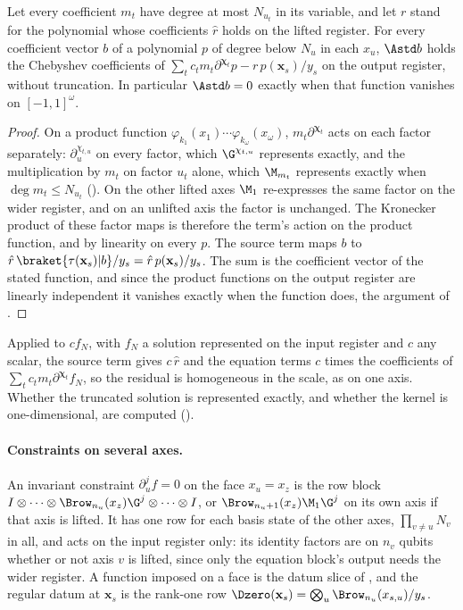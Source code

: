 \begin{proposition}
\label{prop:multi-axis}
Let every coefficient $m_t$ have degree at most $N_{u_t}$ in its variable, and let $r$ stand for the polynomial whose coefficients $\hat r$ holds on the lifted register. For every coefficient vector $b$ of a polynomial $p$ of degree below $N_u$ in each $x_u$, $\Astd b$ holds the Chebyshev coefficients of $\sum_tc_tm_t\partial^{\boldsymbol\chi_t}p-r\,p(\mathbf x_s)/y_s$ on the output register, without truncation. In particular $\Astd b=0$ exactly when that function vanishes on $[-1,1]^\omega$.
\end{proposition}
\begin{proof}
On a product function $\varphi_{k_1}(x_1)\cdots\varphi_{k_\omega}(x_\omega)$, $m_t\partial^{\boldsymbol\chi_t}$ acts on each factor separately: $\partial_u^{\chi_{t,u}}$ on every factor, which $\G^{\chi_{t,u}}$ represents exactly, and the multiplication by $m_t$ on factor $u_t$ alone, which $\M_{m_t}$ represents exactly when $\deg m_t\le N_{u_t}$ (). On the other lifted axes $\M_1$ re-expresses the same factor on the wider register, and on an unlifted axis the factor is unchanged. The Kronecker product of these factor maps is therefore the term's action on the product function, and by linearity on every $p$. The source term maps $b$ to $\hat r\,\braket{\tau(\mathbf x_s)|b}/y_s=\hat r\,p(\mathbf x_s)/y_s$. The sum is the coefficient vector of the stated function, and since the product functions on the output register are linearly independent it vanishes exactly when the function does, the argument of .
\end{proof}
Applied to $cf_N$, with $f_N$ a solution represented on the input register and $c$ any scalar, the source term gives $c\,\hat r$ and the equation terms $c$ times the coefficients of $\sum_tc_tm_t\partial^{\boldsymbol\chi_t}f_N$, so the residual is homogeneous in the scale, as on one axis. Whether the truncated solution is represented exactly, and whether the kernel is one-dimensional, are computed ().

\paragraph{Constraints on several axes.} An invariant constraint $\partial_u^{j}f=0$ on the face $x_u=x_z$ is the row block $I\otimes\dots\otimes\Brow_{n_u}(x_z)\G^{j}\otimes\dots\otimes I$, or $\Brow_{n_u+1}(x_z)\M_1\G^{j}$ on its own axis if that axis is lifted. It has one row for each basis state of the other axes, $\prod_{v\ne u}N_v$ in all, and acts on the input register only: its identity factors are on $n_v$ qubits whether or not axis $v$ is lifted, since only the equation block's output needs the wider register. A function imposed on a face is the datum slice of , and the regular datum at $\mathbf x_s$ is the rank-one row $\Dzero(\mathbf x_s)=\bigotimes_u\Brow_{n_u}(x_{s,u})/y_s$.

